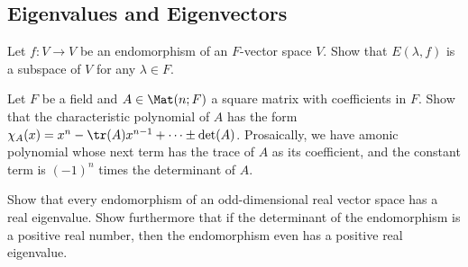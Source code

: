 \subsection{Eigenvalues and Eigenvectors}
\item Let $f : V \to V$ be an endomorphism of an $F$-vector space $V$. Show that $E(\lambda, f)$ is a subspace of $V$ for any $\lambda \in F$.
  
\item Let $F$ be a field and $A \in \Mat(n; F)$ a square matrix with coefficients in $F$. Show that the characteristic polynomial of $A$ has the form $\chi_A(x) = x^n - \tr(A)x^{n-1} + \dots \pm \det(A)$. Prosaically, we have  amonic polynomial whose next term has the trace of $A$ as its coefficient, and the constant term is $(-1)^n$ times the determinant of $A$.
  
\item Show that every endomorphism of an odd-dimensional real vector space has a real eigenvalue. Show furthermore that if the determinant of the endomorphism is a positive real number, then the endomorphism even has a positive real eigenvalue.